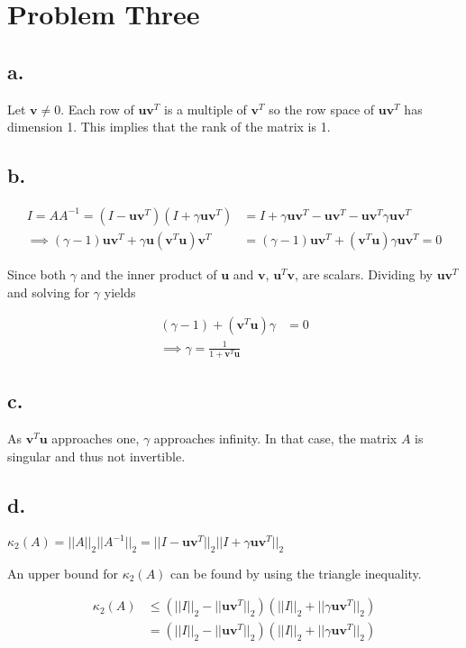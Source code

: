 \documentclass[00-main.tex]{subfiles}
\begin{document}
\section*{Problem Three}

\subsection*{a.}
Let $\mathbf{v} \neq 0$. Each row of $\mathbf{uv}^T$ is a multiple of $\mathbf{v}^T$ so the row space of $\mathbf{uv}^T$ has dimension 1. This implies that the rank of the matrix is 1.

\subsection*{b.}

\begin{align}
\nonumber
I = AA^{-1} = (I-\mathbf{uv}^T)(I+\gamma \mathbf{uv}^T) &= I + \gamma \mathbf{uv}^T - \mathbf{uv}^T - \mathbf{uv}^T \gamma \mathbf{uv}^T \\
\implies
( \gamma - 1) \mathbf{uv}^T + \gamma \mathbf{u} ( \mathbf{v}^T \mathbf{u}) \mathbf{v}^T &= 
( \gamma - 1) \mathbf{uv}^T + ( \mathbf{v}^T \mathbf{u}) \gamma \mathbf{u} \mathbf{v}^T
= 0
\end{align}

Since both $\gamma$ and the inner product of $\mathbf{u}$ and $\mathbf{v}$, $\mathbf{u}^T \mathbf{v}$, are scalars. Dividing by $\mathbf{uv}^T$ and solving for $\gamma$ yields

\begin{align}
\nonumber
( \gamma - 1) + ( \mathbf{v}^T \mathbf{u}) \gamma &= 0 \\
\implies
\gamma = \frac{1}{1+ \mathbf{v}^T \mathbf{u}}
\end{align}

\subsection*{c.}
As $\mathbf{v}^T \mathbf{u}$ approaches one, $\gamma$ approaches infinity. In that case, the matrix $A$ is singular and thus not invertible.

\subsection*{d.}
$\kappa_2(A) = ||A||_2 ||A^{-1}||_2 = ||I-\mathbf{uv}^T||_2 ||I+\gamma \mathbf{uv}^T||_2 $

An upper bound for $\kappa_2(A)$ can be found by using the triangle inequality.

\begin{align*}
\kappa_2(A) & \leq (||I||_2-||\mathbf{uv}^T||_2) (||I||_2+||\gamma \mathbf{uv}^T||_2) \\
&= (||I||_2-||\mathbf{uv}^T||_2) (||I||_2+||\gamma \mathbf{uv}^T||_2)
\end{align*}




\end{document}
